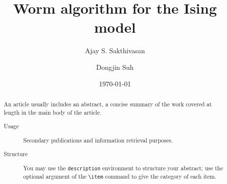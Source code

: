\documentclass[%
reprint,
 amsmath,amssymb,
 aps,
]{revtex4-2}
\begin{document}
\title{Worm algorithm for the Ising model}%

\author{Ajay S. Sakthivasan}
\author{Dongjin Suh}

\date{\today}%

\begin{abstract}
  An article usually includes an abstract, a concise summary of the work
  covered at length in the main body of the article.
  \begin{description}
  \item[Usage]
    Secondary publications and information retrieval purposes.
  \item[Structure]
    You may use the \texttt{description} environment to structure your abstract;
    use the optional argument of the \verb+\item+ command to give the category of each item.
  \end{description}
\end{abstract}
\maketitle

\tableofcontents
\end{document}
